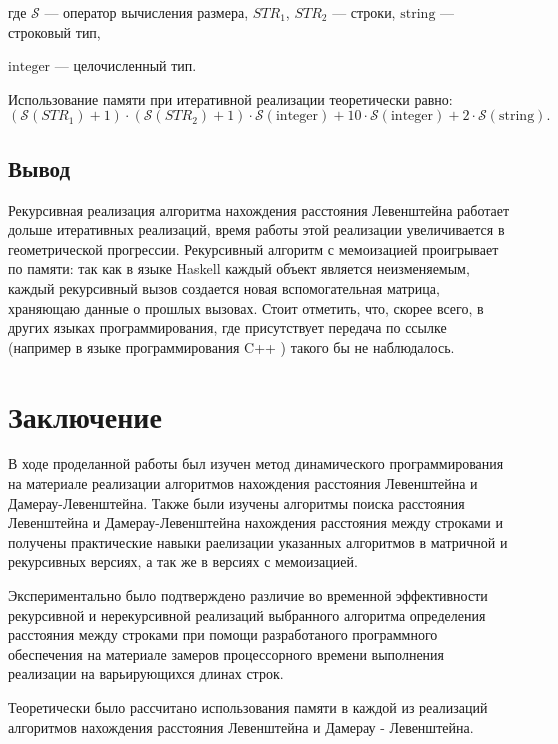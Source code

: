 \documentclass[12pt]{report}
\begin{document}
\noindent где $\mathcal{S}$ — оператор вычисления размера, $STR_1$, $STR_2$ — строки, $\mathrm{string}$ — строковый тип, 

\noindent $\mathrm{integer}$ — целочисленный тип.

Использование памяти при итеративной реализации теоретически равно:
\begin{equation}
(\mathcal{S}(STR_1) + 1) \cdot (\mathcal{S}(STR_2) + 1) \cdot \mathcal{S}\mathrm{(integer)} + 10\cdot \mathcal{S}\mathrm{(integer)} + 2 \cdot \mathcal{S}\mathrm{(string)}.
\end{equation}


\section{Вывод}

Рекурсивная реализация алгоритма нахождения расстояния Левенштейна работает дольше итеративных реализаций, время работы этой реализации увеличивается в геометрической прогрессии. Рекурсивный алгоритм с мемоизацией проигрывает по памяти: так как в языке Haskell каждый объект является неизменяемым, каждый рекурсивный вызов создается новая вспомогательная матрица, храняющаю данные о прошлых вызовах. Стоит отметить, что, скорее всего, в других языках программирования, где присутствует передача по ссылке (например в языке программирования C++ \cite{C++}) такого бы не наблюдалось. 


\chapter*{Заключение}

В ходе проделанной работы был изучен метод динамического программирования на материале реализации алгоритмов нахождения расстояния Левенштейна и Дамерау-Левенштейна. Также были изучены алгоритмы поиска расстояния Левенштейна и Дамерау-Левенштейна нахождения расстояния между строками и получены практические навыки раелизации указанных алгоритмов в матричной и рекурсивных версиях, а так же в версиях с мемоизацией.

Экспериментально было подтверждено различие во временной эффективности рекурсивной и нерекурсивной реализаций выбранного алгоритма определения расстояния между строками при помощи разработаного программного обеспечения на материале замеров процессорного времени выполнения реализации на варьирующихся длинах строк. 

Теоретически было рассчитано использования памяти в каждой из реализаций алгоритмов нахождения расстояния Левенштейна и Дамерау - Левенштейна.



\end{document}
